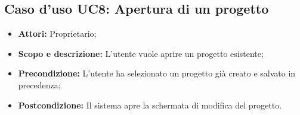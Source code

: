 \subsection{Caso d'uso UC8: Apertura di un progetto}
\begin{itemize}
	\item \textbf{Attori:} Proprietario;
	\item \textbf{Scopo e descrizione:} L'utente vuole aprire un progetto esistente;
	\item \textbf{Precondizione:} L'utente ha selezionato un progetto già creato e salvato in precedenza;
	\item \textbf{Postcondizione:} Il sistema apre la schermata di modifica del progetto.
\end{itemize}

